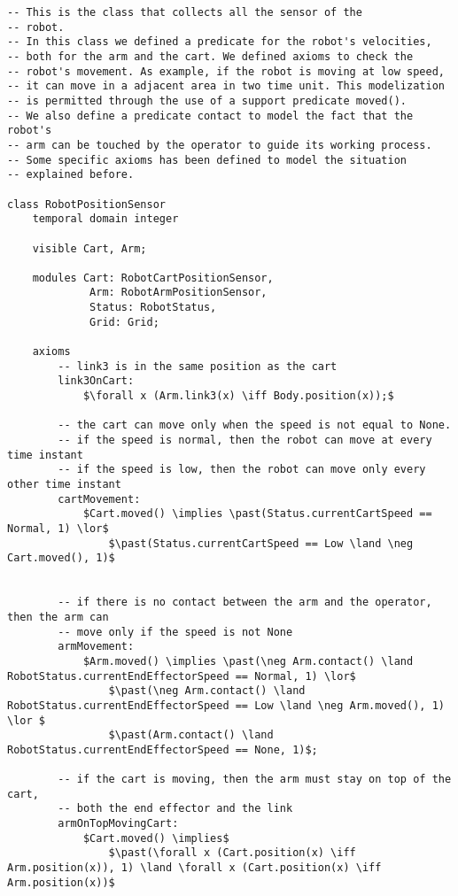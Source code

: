 \begin{lstlisting}[fontadjust, mathescape, frame=single] 
-- This is the class that collects all the sensor of the
-- robot.
-- In this class we defined a predicate for the robot's velocities,
-- both for the arm and the cart. We defined axioms to check the
-- robot's movement. As example, if the robot is moving at low speed,
-- it can move in a adjacent area in two time unit. This modelization
-- is permitted through the use of a support predicate moved().
-- We also define a predicate contact to model the fact that the robot's
-- arm can be touched by the operator to guide its working process.
-- Some specific axioms has been defined to model the situation
-- explained before.

class RobotPositionSensor
    temporal domain integer

    visible Cart, Arm;

    modules Cart: RobotCartPositionSensor,
             Arm: RobotArmPositionSensor,
             Status: RobotStatus,
             Grid: Grid;

    axioms
        -- link3 is in the same position as the cart
        link3OnCart: 
            $\forall x (Arm.link3(x) \iff Body.position(x));$

        -- the cart can move only when the speed is not equal to None.
        -- if the speed is normal, then the robot can move at every time instant
        -- if the speed is low, then the robot can move only every other time instant
        cartMovement:
            $Cart.moved() \implies \past(Status.currentCartSpeed == Normal, 1) \lor$
                $\past(Status.currentCartSpeed == Low \land \neg Cart.moved(), 1)$
            

        -- if there is no contact between the arm and the operator, then the arm can
        -- move only if the speed is not None
        armMovement:
            $Arm.moved() \implies \past(\neg Arm.contact() \land RobotStatus.currentEndEffectorSpeed == Normal, 1) \lor$
                $\past(\neg Arm.contact() \land RobotStatus.currentEndEffectorSpeed == Low \land \neg Arm.moved(), 1) \lor $
                $\past(Arm.contact() \land RobotStatus.currentEndEffectorSpeed == None, 1)$;

        -- if the cart is moving, then the arm must stay on top of the cart,
        -- both the end effector and the link
        armOnTopMovingCart: 
            $Cart.moved() \implies$
                $\past(\forall x (Cart.position(x) \iff Arm.position(x)), 1) \land \forall x (Cart.position(x) \iff Arm.position(x))$


\end{lstlisting}
